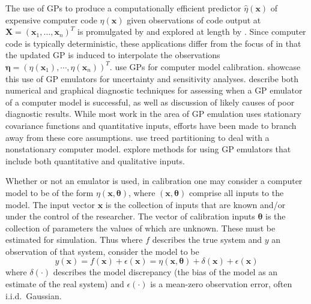 \documentclass[12pt]{article}
\begin{document}
The use of GPs to produce a computationally efficient predictor $\hat \eta (\mathbf x)$ of expensive computer code $\eta(\mathbf x)$ given observations of code output at $\mathbf X=(\mathbf x_1,\ldots,\mathbf x_n)^T$ is promulgated by \cite{Sacks1989} and explored at length by \cite{Santner2003a}.
%
Since computer code is typically deterministic, these applications differ from the focus of \cite{OHagan1978} in that the updated GP is induced to interpolate the observations $\boldsymbol \eta = (\eta(\mathbf x_1),\cdots,\eta(\mathbf x_n))^T$. 
%
\cite{Kennedy2001} use GPs for computer model calibration. 
%
\cite{Kennedy2006} showcase this use of GP emulators for uncertainty and sensitivity analyses. 
%
\cite{Bastos2009} describe both numerical and graphical diagnostic techniques for assessing when a GP emulator of a computer model is successful, as well as discussion of likely causes of poor diagnostic results. 
%
While most work in the area of GP emulation uses stationary covariance functions 
and quantitative inputs, efforts have been made to branch away from these core assumptions. 
%
\cite{Gramacy2008} use treed partitioning to deal with a nonstationary computer model. 
%
\cite{Qian2008} explore methods for using GP emulators that include both quantitative and qualitative inputs.
%

Whether or not an emulator is used, in calibration one may consider a computer model to be of the form $\eta(\mathbf x,\boldsymbol \theta)$, where $(\mathbf x,\boldsymbol \theta)$ comprise all inputs to the model. 
%
The input vector $\mathbf x$ is the collection of inputs that are known and/or under the control of the researcher.
%
The vector of calibration inputs $\boldsymbol \theta$ is the collection of parameters the values of which are unknown. 
%
These must be estimated for simulation. 
%
Thus where $f$ describes the true system and $y$ an observation of that system, consider the model to be 
%
\begin{equation} \label{eq:model_gen}
y(\mathbf x)=f(\mathbf x)+\epsilon(\mathbf x)=\eta(\mathbf x,\boldsymbol \theta) + \delta(\mathbf x)+\epsilon(\mathbf x)
\end{equation} 
%
where $\delta(\cdot)$ describes the model discrepancy (the bias of the model as an estimate of the real system) and $\epsilon(\cdot)$ is a mean-zero observation error, often i.i.d.\ Gaussian. 
%
\end{document}
